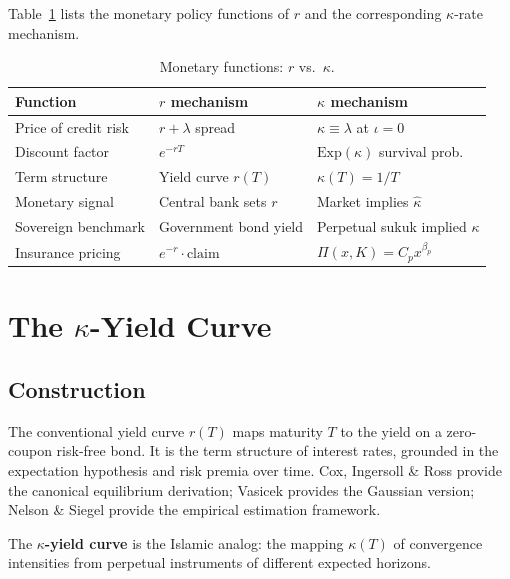 \documentclass[10pt,twocolumn]{article}
\theoremstyle{plain}
\theoremstyle{definition}
\begin{document}
Table~\ref{tab:functions} lists the monetary policy functions of
$r$ and the corresponding $\kappa$-rate mechanism.

\begin{table}[h!]
\centering
\caption{Monetary functions: $r$ vs.\ $\kappa$.}
\label{tab:functions}
\small
\begin{tabular}{@{}p{2.8cm}p{2.1cm}p{2.1cm}@{}}
\toprule
\textbf{Function} & \textbf{$r$ mechanism} & \textbf{$\kappa$ mechanism} \\
\midrule
Price of credit risk & $r + \lambda$ spread & $\kappa \equiv \lambda$ at $\iota=0$ \\
Discount factor & $e^{-rT}$ & $\mathrm{Exp}(\kappa)$ survival prob. \\
Term structure & Yield curve $r(T)$ & $\kappa(T) = 1/T$ \\
Monetary signal & Central bank sets $r$ & Market implies $\hat\kappa$ \\
Sovereign benchmark & Government bond yield & Perpetual sukuk implied $\kappa$ \\
Insurance pricing & $e^{-r} \cdot \text{claim}$ & $\Pi(x,K) = C_p x^{\beta_p}$ \\
\bottomrule
\end{tabular}
\end{table}

\section{The $\kappa$-Yield Curve}
\label{sec:yieldcurve}

\subsection{Construction}

The conventional yield curve $r(T)$ maps maturity $T$ to the
yield on a zero-coupon risk-free bond. It is the term structure
of interest rates, grounded in the expectation hypothesis and
risk premia over time. Cox, Ingersoll \& Ross \cite{CIR1985}
provide the canonical equilibrium derivation; Vasicek
\cite{Vasicek1977} provides the Gaussian version; Nelson \&
Siegel \cite{NelsonSiegel1987} provide the empirical estimation
framework.

The \textbf{$\kappa$-yield curve} is the Islamic analog: the
mapping $\kappa(T)$ of convergence intensities from perpetual
instruments of different expected horizons.
\end{document}
